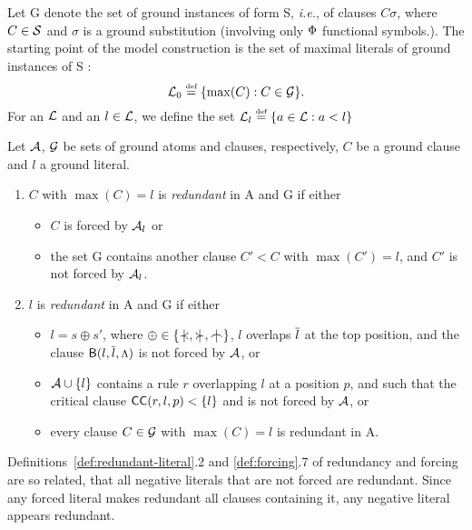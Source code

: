 Let \C G denote the set of ground instances of form \C S, {\it i.e.}, of
clauses \(C\sigma\), where \(C\in \mbox {$\cal S$}\) and $\sigma$ is a ground
substitution (involving only $\Phi$ functional symbols.).  
The starting point of the model construction is the set of
maximal literals of ground instances of \C S :
\begin{equation} \label{eq:max-literals}
\mbox {$\cal L$}_0 \mathrel {\stackrel {\mbox {\tiny def}}{=}} \{\max(C) : C\in \mbox {$\cal G$}\}.
\end{equation}
%
For an $\mbox {$\cal L$}$ and an $l\in\mbox {$\cal L$}$, we define the set \(\mbox {$\cal L$}_l\mathrel {\stackrel {\mbox {\tiny def}}{=}} \{a\in\mbox {$\cal L$}:a<l\}\)
%
\begin{definition} \label{def:redundant-clause}\label{def:redundant-literal}
Let $\mbox {$\cal A$}$, $\mbox {$\cal G$}$  be  sets of ground atoms and clauses, respectively, 
$C$ be a ground clause and $l$ a ground literal.
\begin{enumerate}\smallerspaces
\item
\(C\) with \(\max(C)=l\) is {\em redundant} in \C A and \C G if either
\begin{itemize}\smallerspaces
\item $C$ is forced by \(\mbox {$\cal A$}_l\)  or 
\item the set \C G contains another clause \(C'<C\) with \(\max(C')=l\), and
\(C'\) is not forced by \(\mbox {$\cal A$}_l\).
\end{itemize}
%
\item
$l$ is {\em redundant} in \C A and \C G if either
\begin{itemize}\smallerspaces 
\item \(l=s\oplus s'\), where \(\oplus \in \{\notIncl ,\notCont ,\notInt\}\),
  $l$ overlaps \(\overline{l}\) at the top position, and the clause \({\sf B}(l,\overline{l},\mbox{\footnotesize$\Lambda$})\) is not forced by \(\mbox {$\cal A$}\), or
\item \(\mbox {$\cal A$}\cup\{l\}\) contains a rule $r$ overlapping $l$ at a position $p$,
  and such that the critical clause \({\sf CC}(r,l,p) <\{l\}\) and is not forced
  by \(\mbox {$\cal A$}\), or 
\item every clause $C\in \mbox {$\cal G$}$ with $\max(C)=l$ is redundant in \C A.
\end{itemize}
\end{enumerate}
\end{definition}
\noindent
Definitions~\ref {def:redundant-literal}.2 and \ref {def:forcing}.7
of redundancy and forcing are so related, that all negative literals that are
not forced are redundant. Since any forced literal makes redundant all
clauses containing it, any negative literal appears redundant.

